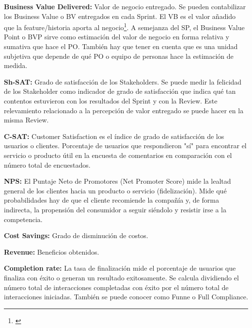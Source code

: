   \begin{description}    

  \item {\textbf{Business Value Delivered:} Valor de negocio entregado. Se pueden contabilizar los Business Value o BV entregados en cada Sprint. El VB es el valor añadido que la feature/historia aporta al negocio\footnote{\cite{Pointet-Botton-2012}}. A semejanza del SP, el Business Value Point o BVP sirve como estimación del valor de negocio en forma relativa y sumativa que hace el PO. También hay que tener en cuenta que es una unidad subjetiva que depende de qué PO o equipo de personas hace la estimación de medida.
} 
 
  \item {\textbf{Sh-SAT:} Grado de satisfacción de los Stakeholders. Se puede medir la felicidad de los Stakeholder como indicador de grado de satisfacción que indica qué tan contentos estuvieron con los resultados del Sprint y con la Review. Este relevamiento relacionado a la percepción de valor entregado se puede hacer en la misma Review.
}

  \item {\textbf{C-SAT:} Customer Satisfaction es el índice de grado de satisfacción de los usuarios o clientes. Porcentaje de usuarios que respondieron "sí" para encontrar el servicio o producto útil en la encuesta de comentarios en comparación con el número total de encuestados.
}

  \item {\textbf{NPS:} El Puntaje Neto de Promotores (Net Promoter Score) mide la lealtad general de los clientes hacia un producto o servicio (fidelización). Mide qué probabilidades hay de que el cliente recomiende la compañía y, de forma indirecta, la propensión del consumidor a seguir siéndolo y resistir irse a la competencia.
}

  \item {\textbf{Cost Savings:} Grado de disminución de costos.
}

  \item {\textbf{Revenue:} Beneficios obtenidos.
}

  \item {\textbf{Completion rate:} La tasa de finalización mide el porcentaje de usuarios que finaliza con éxito o generan un resultado exitosamente. Se calcula dividiendo el número total de interacciones completadas con éxito por el número total de interacciones iniciadas. También se puede conocer como Funne o Full Compliance.
}


\end{description}
